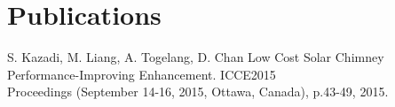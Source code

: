 \documentclass[letterpaper, 10pt]{article}
\begin{document}


\section{Publications}
\begin{flushleft}
  \hspace*{.6em}S. Kazadi, M. Liang, A. Togelang, D. Chan Low Cost Solar Chimney Performance-Improving Enhancement. ICCE2015  \\
  \hspace*{.6em}Proceedings (September 14-16, 2015, Ottawa, Canada), p.43-49, 2015.
\end{flushleft}



\end{document}
